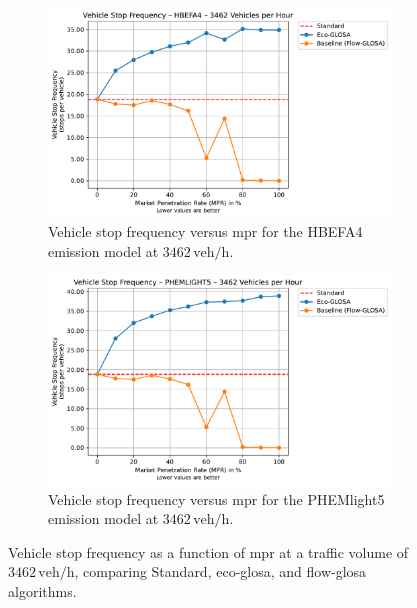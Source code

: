 \begin{figure}[htb]
  \centering
  \begin{subfigure}[b]{0.45\textwidth}
    \includegraphics[width=\textwidth]{data/img/VehicleStopFrequency/VehicleStopFrequency_HBEFA4_Cars3462.pdf}
    \caption{Vehicle stop frequency versus \ac{mpr} for the HBEFA4 emission model at $3462\,\mathrm{veh/h}$.}
  \end{subfigure}\hfill
  \begin{subfigure}[b]{0.45\textwidth}
    \includegraphics[width=\textwidth]{data/img/VehicleStopFrequency/VehicleStopFrequency_PHEMLIGHT5_Cars3462.pdf}
    \caption{Vehicle stop frequency versus \ac{mpr} for the PHEMlight5 emission model at $3462\,\mathrm{veh/h}$.}
  \end{subfigure}
  \caption{Vehicle stop frequency as a function of \ac{mpr} at a traffic volume of $3462\,\mathrm{veh/h}$, comparing Standard, \ac{eco-glosa}, and \ac{flow-glosa} algorithms.}
  \label{fig:StopFreq_3462}
\end{figure}


